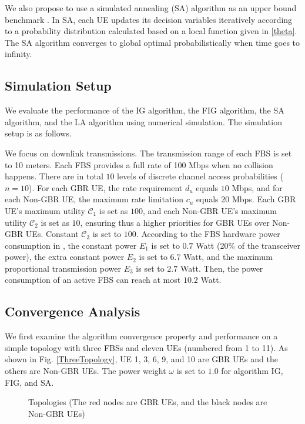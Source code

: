 \documentclass[conference]{IEEEtran}
\begin{document}
We also propose to use a simulated annealing (SA) algorithm as an upper bound benchmark \cite{borst2014nonconcave}. In SA, each UE updates its decision variables iteratively according to a probability distribution calculated based on a local function given in \eqref{theta}. The SA algorithm converges to global optimal probabilistically when time goes to infinity.

\subsection{Simulation Setup}

We evaluate the performance of the IG algorithm, the FIG algorithm, the SA algorithm, and the LA algorithm using numerical simulation. The simulation setup is as follows.

We focus on downlink transmissions. The transmission range of each FBS is set to 10 meters. Each FBS provides a full rate of 100 Mbps when no collision happens. There are in total $10$ levels of discrete channel access probabilities ($n=10$). For each GBR UE, the rate requirement $d_u$ equals $10$ Mbps, and for each Non-GBR UE, the maximum rate limitation $c_u$ equals 20 Mbps. Each GBR UE's maximum utility $\mathcal{C}_1$ is set as $100$, and each Non-GBR UE's maximum utility $\mathcal{C}_2$ is set as $10$, ensuring thus a higher priorities for GBR UEs over Non-GBR UEs. Constant $\mathcal{C}_3$ is set to $100$. According to the FBS hardware power consumption in \cite{ashraf2011sleep}, the constant power $E_1$ is set to $0.7$ Watt (20\% of the transceiver power), the extra constant power $E_2$ is set to $6.7$ Watt, and the maximum proportional transmission power $E_3$ is set to $2.7$ Watt. Then, the power consumption of an active FBS can reach at most $10.2$ Watt. 


\subsection{Convergence Analysis}

We first examine the algorithm convergence property and performance on a simple topology with three FBSs and eleven UEs (numbered from 1 to 11). As shown in Fig. \ref{ThreeTopology}, UE 1, 3, 6, 9, and 10 are GBR UEs and the others are Non-GBR UEs. The power weight $\omega$ is set to $1.0$ for algorithm IG, FIG, and SA. 

\begin{figure}[!htbp]
\centering
{}
\caption{Topologies (The red nodes are GBR UEs, and the black nodes are Non-GBR UEs)}
\end{figure}
\end{document}
